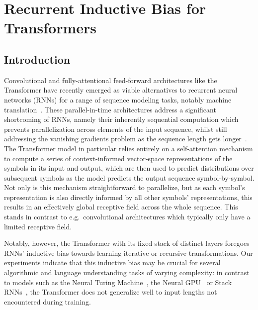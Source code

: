 \chapter{Recurrent Inductive Bias for Transformers}
\label{chap:6}
\section{Introduction}
Convolutional and fully-attentional feed-forward architectures like the Transformer have recently emerged as viable alternatives to recurrent neural networks (RNNs) for a range of sequence modeling tasks, notably machine translation~\citep{JonasFaceNet2017,transformer}. These parallel-in-time architectures address a significant shortcoming of RNNs, namely their inherently sequential computation which prevents parallelization across elements of the input sequence, whilst still addressing the vanishing gradients problem as the sequence length gets longer~\citep{vanishing-exploding-gradient}.
The Transformer model in particular relies entirely on a self-attention mechanism \citep{decomposableAttnModel,lin2017structured} to compute a series of context-informed vector-space representations of the symbols in its input and output, which are then used to predict distributions over subsequent symbols as the model predicts the output sequence symbol-by-symbol. Not only is this mechanism straightforward to parallelize, but as each symbol's representation is also directly informed by all other symbols' representations, this results in an effectively global receptive field across the whole sequence. This stands in contrast to e.g.\ convolutional architectures which typically only have a limited receptive field.

Notably, however, the Transformer with its fixed stack of distinct layers foregoes RNNs' inductive bias towards learning iterative or recursive transformations. Our experiments indicate that this inductive bias may be crucial for several algorithmic and language understanding tasks of varying complexity: in contrast to models such as the Neural Turing Machine~\citep{ntm14}, the Neural GPU~\citep{neural_gpu} or Stack RNNs~\citep{stack_rnn}, the Transformer does not generalize well to input lengths not encountered during training. 

